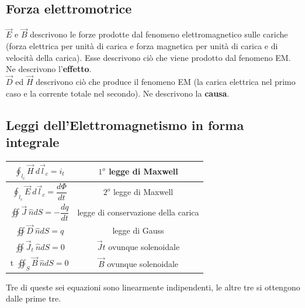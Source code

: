 \documentclass{article}
\begin{document}
\subsection{Forza elettromotrice}
$\vec E$ e $\vec B$ descrivono le forze prodotte dal fenomeno elettromagnetico sulle
cariche (forza elettrica per unità di carica e forza magnetica per unità di
carica e di velocità della carica). Esse descrivono ciò che viene prodotto dal
fenomeno EM. Ne descrivono l'\textbf{effetto}.
\vspace*{0.1cm}\\
$\vec D$ ed $\vec H$ descrivono ciò che produce il fenomeno EM (la carica elettrica nel
primo caso e la corrente totale nel secondo). Ne descrivono la \textbf{causa}.

\subsection{Leggi dell'Elettromagnetismo in forma integrale}
\renewcommand{\arraystretch}{2.5}
\begin{center}
    \begin{tabular}{|c|c|}
        \hline
        $\oint_{l_c} \vec H \ d \vec l_c = i_t$ & $1^o$ legge di Maxwell\\
        \hline 
        $\oint_{l_c} \vec E \ d \vec l_c = \dfrac{d\Phi}{dt}$ & $2^o$ legge di Maxwell\\
        \hline
        $\oiint \vec J \ \hat n dS = - \dfrac{dq}{dt}$ & legge di conservazione della carica \\
        \hline
        $\oiint \vec D \ \hat n dS = q $ & legge di Gauss\\
        \hline 
        $\oiint \vec J_t \ \hat n dS = 0 $ & $\vec Jt$ ovunque solenoidale\\
        \hline t
        $\oiint _S \vec B \ \hat n dS=0$ & $\vec B$ ovunque solenoidale\\
        \hline
    \end{tabular}    
\end{center}
Tre di queste sei equazioni sono linearmente indipendenti, le altre tre si ottengono dalle prime tre.
\end{document}
